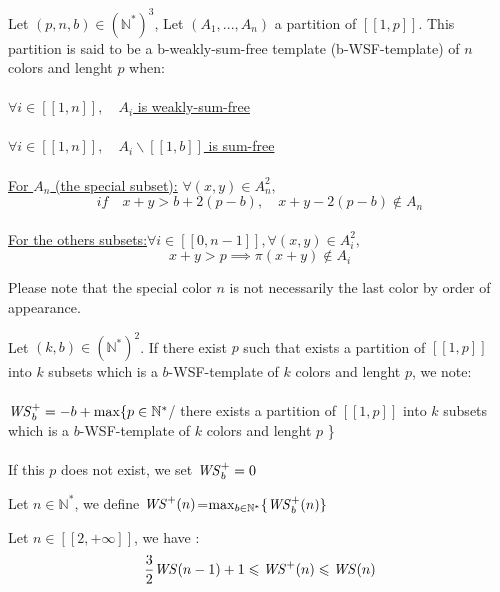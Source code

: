 \begin{definition}
Let \( (p,n,b) \in (\mathbb{N}^*)^3\), Let \((A_1,...,A_n)\) a partition of  \([\![1, p]\!]\).
This partition is said to be a b-weakly-sum-free template (b-WSF-template) of \(n\) colors and lenght \(p\) when:
\\\\
\underline{\(\forall i \in [\![1, n]\!], \quad A_i\) is weakly-sum-free}
\\\\
\underline{\(\forall i \in [\![1, n]\!], \quad A_i\backslash [\![1, b]\!]\) is sum-free}
\\\\
\underline{For \(A_n\) (the special subset):} \quad \(\forall (x,y) \in A_n^2,\)
\\
\[if \quad x+y>b+2(p-b),\quad x+y-2(p-b)\notin A_n\]
\\
\underline{For the others subsets:}\quad \(\forall i \in [\![0,n-1]\!], \forall(x,y) \in A_i^2,\)
\\
\[
x+y>p \implies \pi(x+y) \notin A_i
\]
\end{definition}


\begin{remark}
	Please note that the special color \(n\) is not necessarily the last color by order of appearance.
\end{remark}

\begin{definition}
Let \( (k,b) \in (\mathbb{N}^*)^2\). If there exist \(p\) such that exists a partition of \([\![1, p]\!]\) into \(k\)
subsets which is a \(b\)-WSF-template of \(k\) colors and lenght \(p\), we note:
\\\\\(\mathit{WS}_b^+=-b+\max \{p\in \mathbb{N}^*\)/ there exists a partition of \([\![1, p]\!]\) into \(k\) subsets which is a
\(b\)-WSF-template of \(k\) colors and lenght \(p\) \}
\\\\
If this \(p\) does not exist, we set \(\mathit{WS}_b^+= 0\)
\end{definition}

\begin{definition}
Let \( n \in \mathbb{N}^*\), we define \(\mathit{WS}^+(n)\)=\(\max_{b\in \mathbb{N}^*} \{\mathit{WS}_b^+(n)\}\)
\end{definition}

\begin{proposition}
	Let \(n \in [\![2, +\infty]\!]\), we have :
	\[
	\frac{3}{2} \mathit{WS} (n-1)+1 \leqslant \mathit{WS}^+(n) \leqslant \mathit{WS} (n)
	\]
\end{proposition}

